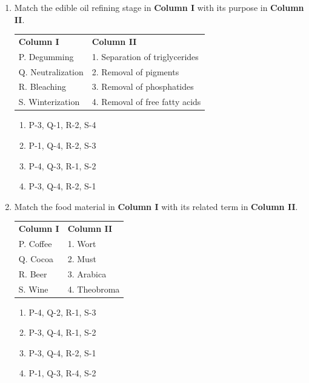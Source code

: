 \documentclass[journal,12pt,onecolumn]{IEEEtran}
\begin{document}
\begin{enumerate}[label=\arabic*.,resume]
\item Match the edible oil refining stage in \textbf{Column I} with its purpose in \textbf{Column II}.
\begin{table}[H]
\centering
\begin{tabular}{ll}
\textbf{Column I} & \textbf{Column II} \\
P. Degumming & 1. Separation of triglycerides \\
Q. Neutralization & 2. Removal of pigments \\
R. Bleaching & 3. Removal of phosphatides \\
S. Winterization & 4. Removal of free fatty acids \\
\end{tabular}
\end{table}

\begin{multicols}{2}
\begin{enumerate}[label=(\Alph*)]
\item P-3, Q-1, R-2, S-4
\item P-1, Q-4, R-2, S-3
\item P-4, Q-3, R-1, S-2
\item P-3, Q-4, R-2, S-1
\end{enumerate}
\end{multicols}

\item Match the food material in \textbf{Column I} with its related term in \textbf{Column II}.
\begin{table}[H]
\centering
\begin{tabular}{ll}
\textbf{Column I} & \textbf{Column II} \\
P. Coffee & 1. Wort \\
Q. Cocoa & 2. Must \\
R. Beer & 3. Arabica \\
S. Wine & 4. Theobroma \\
\end{tabular}
\end{table}

\begin{multicols}{2}
\begin{enumerate}[label=(\Alph*)]
\item P-4, Q-2, R-1, S-3
\item P-3, Q-4, R-1, S-2
\item P-3, Q-4, R-2, S-1
\item P-1, Q-3, R-4, S-2
\end{enumerate}
\end{multicols}


\end{enumerate}
\end{document}
